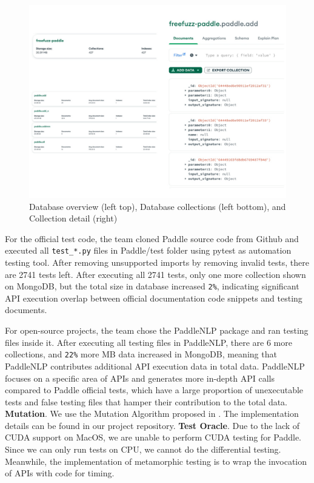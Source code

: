 \documentclass[sigconf]{acmart}
\begin{document}
  \begin{figure}[h]
    \centering
    \includegraphics[width=\linewidth]{3.png}
    \caption{Database overview (left top), Database collections (left bottom), and Collection detail (right)}
  \end{figure}

  \par For the official test code, the team cloned Paddle source code from Github and executed all \verb|test_*.py| files in Paddle/test folder using pytest as automation testing tool. 
  After removing unsupported imports by removing invalid tests, there are 2741 tests left. After executing all 2741 tests, only one more collection shown on MongoDB, but the total size in database increased  \verb|2%|, 
  indicating significant API execution overlap between official documentation code snippets and testing documents.

  \par For open-source projects, the team chose the PaddleNLP package and ran testing files inside it. After executing all testing files in PaddleNLP, there are 6 more collections, and \verb|22%| more MB data increased in MongoDB, 
  meaning that PaddleNLP contributes additional API execution data in total data. PaddleNLP focuses on a specific area of APIs and generates more in-depth API calls compared to Paddle official tests, 
  which have a large proportion of unexecutable tests and false testing files that hamper their contribution to the total data.
  \newline \textbf{Mutation}.
  We use the  Mutation Algorithm proposed in \cite{w1}. The implementation details can be
  found in our project repository.
  \newline \textbf{Test Oracle}.
  Due to the lack of CUDA support on MacOS, we are unable to perform CUDA testing for Paddle.
  Since we can only run tests on CPU, we cannot do the differential testing.
  Meanwhile, the implementation of metamorphic testing is to wrap the invocation of APIs with code for timing.\cite{w1}
  
\end{document}
